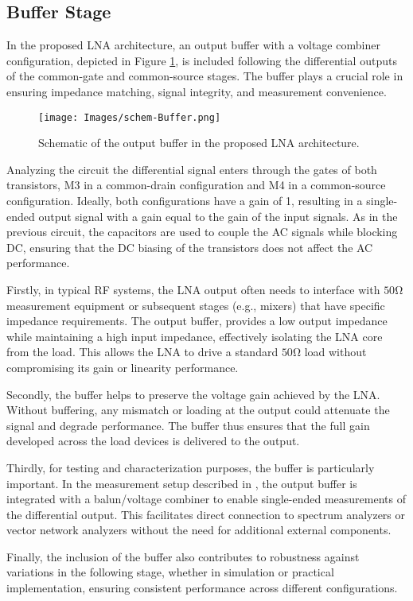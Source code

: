 \subsection{Buffer Stage}

In the proposed LNA architecture, an output buffer with a voltage combiner configuration, depicted in Figure \ref{fig:schem-buffer}, is included following the differential outputs of the common-gate and common-source stages. The buffer plays a crucial role in ensuring impedance matching, signal integrity, and measurement convenience.

\begin{figure}[H]
    \centering
    \texttt{[image: Images/schem-Buffer.png]}
    \caption{Schematic of the output buffer in the proposed LNA architecture.}
    \label{fig:schem-buffer}
\end{figure}

Analyzing the circuit the differential signal enters through the gates of both transistors, M3 in a common-drain configuration and M4 in a common-source configuration. Ideally, both configurations have a gain of 1, resulting in a single-ended output signal with a gain equal to the gain of the input signals. As in the previous circuit, the capacitors are used to couple the AC signals while blocking DC, ensuring that the DC biasing of the transistors does not affect the AC performance.

Firstly, in typical RF systems, the LNA output often needs to interface with $50 \si{\ohm}$ measurement equipment or subsequent stages (e.g., mixers) that have specific impedance requirements. The output buffer, provides a low output impedance while maintaining a high input impedance, effectively isolating the LNA core from the load. This allows the LNA to drive a standard $50 \si{\ohm}$ load without compromising its gain or linearity performance.

Secondly, the buffer helps to preserve the voltage gain achieved by the LNA. Without buffering, any mismatch or loading at the output could attenuate the signal and degrade performance. The buffer thus ensures that the full gain developed across the load devices is delivered to the output.

Thirdly, for testing and characterization purposes, the buffer is particularly important. In the measurement setup described in \cite{Bastos2014}, the output buffer is integrated with a balun/voltage combiner to enable single-ended measurements of the differential output. This facilitates direct connection to spectrum analyzers or vector network analyzers without the need for additional external components.

Finally, the inclusion of the buffer also contributes to robustness against variations in the following stage, whether in simulation or practical implementation, ensuring consistent performance across different configurations.